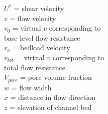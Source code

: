 \documentclass[11pt,a4paper]{article}
\begin{document}
\begin{multicols}{2}
$U^\ast$ = shear velocity \vspace{1.5ex} \\
$v$ = flow velocity \vspace{1.5ex} \\
$v_0$ = virtual $v$ corresponding to\\base-level flow resistance \vspace{1.5ex} \\
$v_b$ = bedload velocity \vspace{1.5ex} \\
$v_{tot}$ = virtual $v$ corresponding to\\total flow resistance \vspace{1.5ex} \\
$V_{pore}$ = pore volume fraction \vspace{1.5ex} \\
$w$ = flow width \vspace{1.5ex} \\
$x$ = distance in flow direction \vspace{1.5ex} \\
$z$ = elevation of channel bed \vspace{1.5ex} \\
\end{multicols}

\pagebreak
\listoftables
{}
\listoffigures
\vfill

\pagebreak{}


\end{document}
